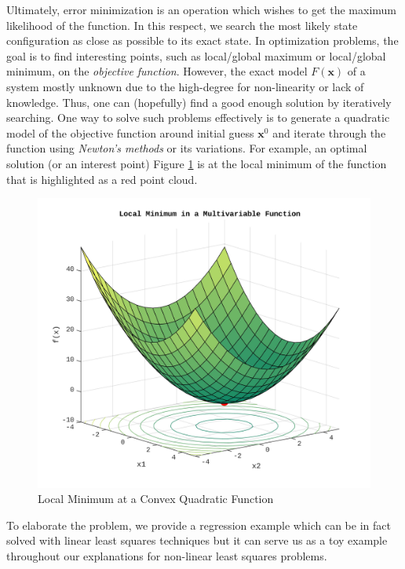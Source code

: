 \documentclass[a4paper]{report}
\numberwithin{figure}{section}
\begin{document}
\begin{appendices}
Ultimately, error minimization is an 
operation which wishes to get the maximum likelihood of the function. In this 
respect, 
we search the most 
likely state configuration as close as possible to its exact state. 
In optimization problems,
the goal is to find interesting points, such as local/global
maximum or local/global minimum, on the \textit{objective}
\textit{function}. However, the exact model $F(\mathbf{x})$ of a system 
mostly unknown due to the high-degree for non-linearity or lack of knowledge.
Thus, one can (hopefully) find a good enough solution by iteratively searching.
One way to solve such problems effectively is to generate a quadratic model of 
the objective function around initial guess $\mathbf{x}^0$ and iterate
through the function using \textit{Newton's methods} or its variations.
For example,
an optimal solution (or an interest point)
Figure \ref{fig:lsq_multivariable_function_example} is at the local
minimum of the function that is highlighted as a red point cloud.


\begin{figure}[H]
	\centering
  \includegraphics[width=0.7\linewidth,natwidth=640,natheight=640]
	{fig/lsq_multivariable_function_example.jpg}
	\caption{Local Minimum at a Convex Quadratic Function}
	\label{fig:lsq_multivariable_function_example}
\end{figure}

To elaborate the problem, we provide a regression example 
which can be in fact solved with linear least squares techniques but 
it can serve us 
as a toy example throughout our explanations for non-linear least squares 
problems.


\end{appendices}
\end{document}
